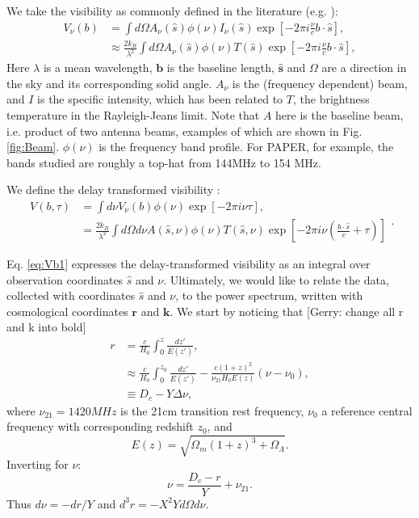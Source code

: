 \documentclass[preprint2,numberedappendix,tighten,twocolappendix]{aastex6}  %
\renewcommand\[{\begin{equation}}
\renewcommand\]{\end{equation}}
\begin{document}
We take the visibility as commonly defined in the literature (e.g.
\cite{first-paper}): 
\begin{equation}
\begin{aligned}V_{\nu}(b) & =\int d\Omega A_{\nu}(\hat{s})\phi(\nu)I_{\nu}(\hat{s})\exp\left[-2\pi i\frac{\nu}{c}b\cdot\hat{s}\right],\\
 & \approx\frac{2k_{B}}{\lambda^{2}}\int d\Omega A_{\nu}(\hat{s})\phi(\nu)T(\hat{s})\exp\left[-2\pi i\frac{\nu}{c}b\cdot\hat{s}\right],
\end{aligned}
\label{eq:Vis1}
\end{equation}
Here $\lambda$ is a mean wavelength, $\boldsymbol{b}$ is the baseline
length, $\hat{\boldsymbol{s}}$ and $\Omega$ are a direction in the
sky and its corresponding solid angle. $A_{\nu}$ is the (frequency
dependent) beam, and $I$ is the specific intensity, which has been
related to $T$, the brightness temperature in the Rayleigh-Jeans
limit. Note that $A$ here is the baseline beam, i.e. product of two antenna beams, examples of which are shown in Fig.\ref{fig:Beam}. $\phi(\nu)$ is the frequency band profile. For PAPER, for example,
the bands studied are roughly a top-hat from 144MHz to 154 MHz. 

We define the delay transformed visibility \cite{delay-transform}:
\small
\begin{equation}
\begin{aligned}V(b,\tau) & =\int d\nu V_{\nu}(b)\phi(\nu)\exp\left[-2\pi i\nu\tau\right],\\
 & =\frac{2k_{B}}{\lambda^{2}}\int d\Omega d\nu A(\hat{s},\nu)\phi(\nu)T(\hat{s},\nu)\exp\left[-2\pi i\nu\left(\frac{b\cdot\hat{s}}{c}+\tau\right)\right]
\end{aligned}
.\label{eq:Vb1}
\end{equation}
\normalsize


Eq. \eqref{eq:Vb1} expresses the delay-transformed visibility as
an integral over observation coordinates $\hat{s}$ and $\nu$. Ultimately,
we would like to relate the data, collected with coordinates $\hat{s}$
and $\nu$, to the power spectrum, written with cosmological coordinates
$\boldsymbol{r}$ and $\boldsymbol{k}$. We start by noticing that
{[}Gerry: change all r and k into bold{]} 
\[
\begin{aligned}r & =\frac{c}{H_{0}}\int_{0}^{z}\frac{dz'}{E(z')},\\
 & \approx\frac{c}{H_{0}}\int_{0}^{z_{0}}\frac{dz'}{E(z')}-\frac{c(1+z)^{2}}{\nu_{21}H_{0}E(z)}\left(\nu-\nu_{0}\right),\\
 & \equiv D_{c}-Y\Delta\nu,
\end{aligned}
\]
where $\nu_{21}=1420MHz$ is the 21cm transition rest frequency, $\nu_{0}$
a reference central frequency with corresponding redshift $z_{0}$,
and 
\[
E(z)=\sqrt{\Omega_{m}(1+z)^{3}+\Omega_{\Lambda}}.
\]
Inverting for $\nu$:
\begin{equation}
\nu=\frac{D_{c}-r}{Y}+\nu_{21}.\label{eq:nur}
\end{equation}
Thus $d\nu=-dr/Y$ and $d^{3}r=-X^{2}Yd\Omega d\nu$. 
\end{document}
